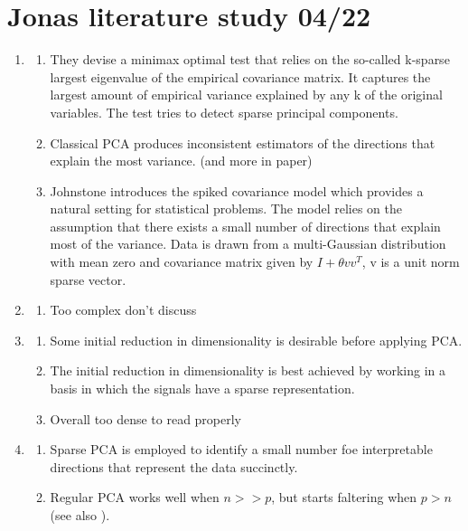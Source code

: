 \documentclass{article}
\begin{document}
\section{Jonas literature study 04/22}
\begin{enumerate}
    \item \cite{Berthet2013}
    \begin{enumerate}
         \item They devise a minimax optimal test that relies on the so-called k-sparse largest eigenvalue of the empirical covariance matrix. It captures the largest amount of empirical variance explained by any k of the original variables. The test tries to detect sparse principal components.
        \item Classical PCA produces inconsistent estimators of the directions that explain the most variance. \cite{Johnstone2009} (and more in paper)
        \item Johnstone \citeyear{Johnstone2001} introduces the spiked covariance model which provides a natural setting for statistical problems. The model relies on the assumption that there exists a small number of directions that explain most of the variance. Data is drawn from a multi-Gaussian distribution with mean zero and covariance matrix given by $I + \theta vv^T$, v is a unit norm sparse vector.
    \end{enumerate}
    \item \cite{Johnstone2001}
    \begin{enumerate}
        \item Too complex don't discuss
    \end{enumerate}
    \item \cite{Johnstone2009}
    \begin{enumerate}
        \item Some initial reduction in dimensionality is desirable before applying PCA.
        \item The initial reduction in dimensionality is best achieved by working in a basis in which the signals have a sparse representation.
        \item Overall too dense to read properly
    \end{enumerate}
    \item \cite{Wang2016}
    \begin{enumerate}
        \item Sparse PCA is employed to identify a small number foe interpretable directions that represent the data succinctly.
        \item Regular PCA works well when $n >> p$, but starts faltering when $p > n$ (see also \cite{Johnstone2009}).

\end{enumerate}
\end{enumerate}
\end{document}
